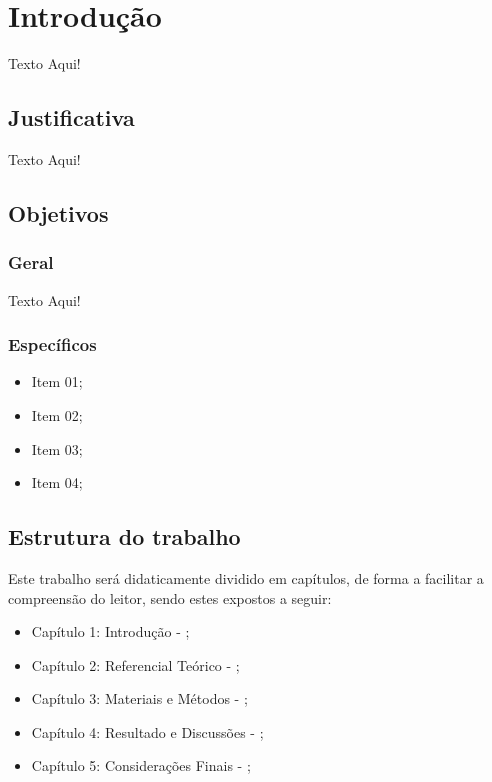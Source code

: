 

\chapter[Introdução]{Introdução}
\vspace{1cm}

Texto Aqui!


\section{Justificativa}

Texto Aqui!



\section{Objetivos}

\subsection{Geral}

Texto Aqui!

\subsection{Específicos}
\begin{itemize}
	\item Item 01;
	
	\item Item 02;
    
    \item Item 03;
    
    \item Item 04;
\end{itemize}



\section{Estrutura do trabalho}

Este trabalho será didaticamente dividido em capítulos, de forma a facilitar a compreensão do leitor, sendo estes expostos a seguir:

\begin{itemize}
    \item Capítulo 1: Introdução - ;

    \item Capítulo 2: Referencial Teórico - ;
    
    \item Capítulo 3: Materiais e Métodos - ;
    
    \item Capítulo 4: Resultado e Discussões - ;
    
    \item Capítulo 5: Considerações Finais - ;

\end{itemize}